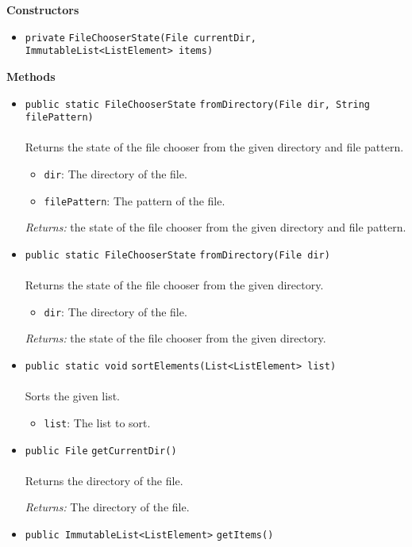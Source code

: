 \textbf{\sffamily Constructors}
\begin{itemize}
\item \lstinline|private| \lstinline|FileChooserState|\lstinline|(File currentDir, ImmutableList<ListElement> items)| \\[-0.6em]




\end{itemize}


\textbf{\sffamily Methods}
\begin{itemize}
\item \lstinline|public static FileChooserState| \lstinline|fromDirectory|\lstinline|(File dir, String filePattern)|\\ \\[-0.6em]
Returns the state of the file chooser from the given directory and file pattern.
\begin{itemize}
\item \lstinline|dir|: The directory of the file.
\item \lstinline|filePattern|: The pattern of the file.
\end{itemize}

\emph{Returns:} the state of the file chooser from the given directory and file pattern.

\item \lstinline|public static FileChooserState| \lstinline|fromDirectory|\lstinline|(File dir)|\\ \\[-0.6em]
Returns the state of the file chooser from the given directory.
\begin{itemize}
\item \lstinline|dir|: The directory of the file.
\end{itemize}

\emph{Returns:} the state of the file chooser from the given directory.

\item \lstinline|public static void| \lstinline|sortElements|\lstinline|(List<ListElement> list)|\\ \\[-0.6em]
Sorts the given list.
\begin{itemize}
\item \lstinline|list|: The list to sort.
\end{itemize}



\item \lstinline|public File| \lstinline|getCurrentDir|\lstinline|()|\\ \\[-0.6em]
Returns the directory of the file.

\emph{Returns:} The directory of the file.

\item \lstinline|public ImmutableList<ListElement>| \lstinline|getItems|\lstinline|()| \\[-0.6em]




\end{itemize}

